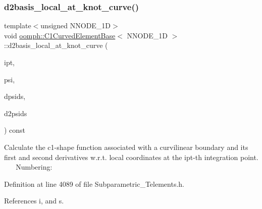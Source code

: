 \subsubsection{\texorpdfstring{d2basis\+\_\+local\+\_\+at\+\_\+knot\+\_\+curve()}{d2basis\_local\_at\_knot\_curve()}}
{\footnotesize\ttfamily template$<$unsigned N\+N\+O\+D\+E\+\_\+1D$>$ \\
void \hyperlink{classoomph_1_1C1CurvedElementBase}{oomph\+::\+C1\+Curved\+Element\+Base}$<$ N\+N\+O\+D\+E\+\_\+1D $>$\+::d2basis\+\_\+local\+\_\+at\+\_\+knot\+\_\+curve (\begin{DoxyParamCaption}\item[{const unsigned \&}]{ipt,  }\item[{\hyperlink{classoomph_1_1Shape}{Shape} \&}]{psi,  }\item[{\hyperlink{classoomph_1_1DShape}{D\+Shape} \&}]{dpsids,  }\item[{\hyperlink{classoomph_1_1DShape}{D\+Shape} \&}]{d2psids }\end{DoxyParamCaption}) const\hspace{0.3cm}{\ttfamily [inline]}}

Calculate the c1-\/shape function associated with a curvilinear boundary and its first and second derivatives w.\+r.\+t. local coordinates at the ipt-\/th integration point. ~\newline
~\newline
 Numbering\+: 

Definition at line 4089 of file Subparametric\+\_\+\+Telements.\+h.



References i, and s.

\mbox{\label{classoomph_1_1C1CurvedElementBase_a103822347941f4ac149d86066ca121a1}} 
